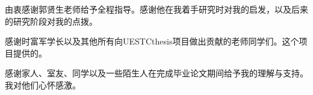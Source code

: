 
由衷感谢郭贤生老师给予全程指导。感谢他在我着手研究时对我的启发，以及后来的研究阶段对我的点拨。

感谢时富军学长以及其他所有向UESTCthesis项目做出贡献的老师同学们。这个项目提供的。

感谢家人、室友、同学以及一些陌生人在完成毕业论文期间给予我的理解与支持。我对他们心怀感激。
